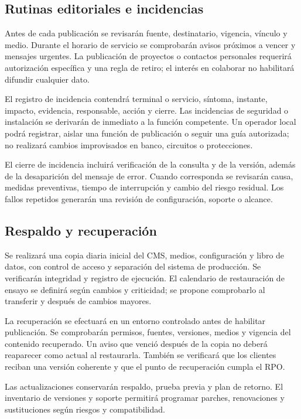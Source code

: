 \subsection{Rutinas editoriales e incidencias}
Antes de cada publicación se revisarán fuente, destinatario, vigencia, vínculo y medio. Durante el horario de servicio se comprobarán avisos próximos a vencer y mensajes urgentes. La publicación de proyectos o contactos personales requerirá autorización específica y una regla de retiro; el interés en colaborar no habilitará difundir cualquier dato.

El registro de incidencia contendrá terminal o servicio, síntoma, instante, impacto, evidencia, responsable, acción y cierre. Las incidencias de seguridad o instalación se derivarán de inmediato a la función competente. Un operador local podrá registrar, aislar una función de publicación o seguir una guía autorizada; no realizará cambios improvisados en banco, circuitos o protecciones.

El cierre de incidencia incluirá verificación de la consulta y de la versión, además de la desaparición del mensaje de error. Cuando corresponda se revisarán causa, medidas preventivas, tiempo de interrupción y cambio del riesgo residual. Los fallos repetidos generarán una revisión de configuración, soporte o alcance.

\subsection{Respaldo y recuperación}
Se realizará una copia diaria inicial del CMS, medios, configuración y libro de datos, con control de acceso y separación del sistema de producción. Se verificarán integridad y registro de ejecución. El calendario de restauración de ensayo se definirá según cambios y criticidad; se propone comprobarlo al transferir y después de cambios mayores.

La recuperación se efectuará en un entorno controlado antes de habilitar publicación. Se comprobarán permisos, fuentes, versiones, medios y vigencia del contenido recuperado. Un aviso que venció después de la copia no deberá reaparecer como actual al restaurarla. También se verificará que los clientes reciban una versión coherente y que el punto de recuperación cumpla el RPO.

Las actualizaciones conservarán respaldo, prueba previa y plan de retorno. El inventario de versiones y soporte permitirá programar parches, renovaciones y sustituciones según riesgos y compatibilidad.

